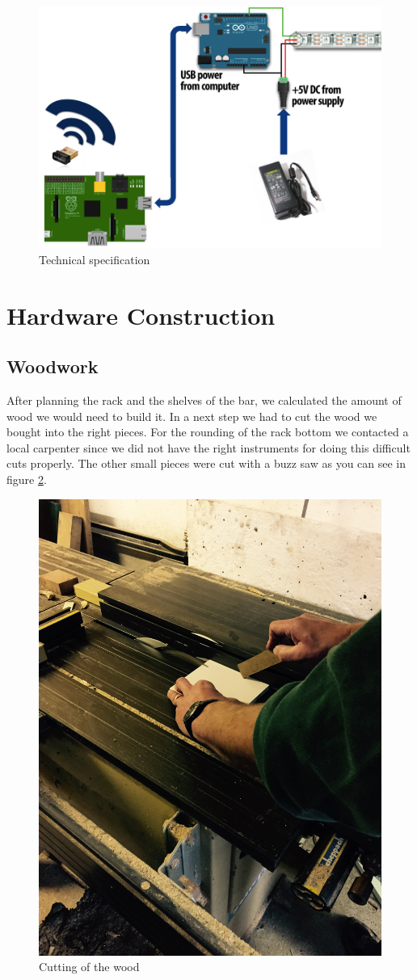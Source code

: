 \documentclass{acm_proc_article-sp}
\begin{document}
\begin{figure}[htbp] 
  \centering
     \includegraphics[width=0.7\linewidth]{pictures/technical.png}
  \caption{Technical specification}
  \label{fig:technical}
\end{figure}

\section{Hardware Construction}
\subsection{Woodwork}
After planning the rack and the shelves of the bar, we calculated the amount of wood we would need to build it. In a next step we had to cut the wood we bought into the right pieces. For the rounding of the rack bottom we contacted a local carpenter since we did not have the right instruments for doing this difficult cuts properly. The other small pieces were cut with a buzz saw as you can see in figure \ref{fig:cutting_wood}.

\begin{figure}[htbp] 
  \centering
     \includegraphics[width=0.5\linewidth]{pictures/cutting_wood.jpg}
  \caption{Cutting of the wood}
  \label{fig:cutting_wood}
\end{figure}
\end{document}
